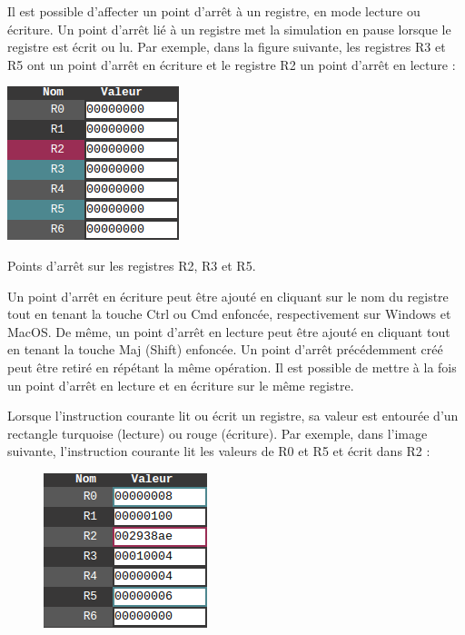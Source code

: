 \documentclass{tufte-handout}
\begin{document}
Il est possible d'affecter un point d'arrêt à un registre, en mode lecture ou écriture. Un point d'arrêt lié à un registre met la simulation en pause lorsque le registre est écrit ou lu. Par exemple, dans la figure suivante, les registres R3 et R5 ont un point d'arrêt en écriture et le registre R2 un point d'arrêt en lecture :
\begin{marginfigure}
\includegraphics[width=0.8\linewidth]{pics/registres_bkpt.png}
\label{f:regbkpt}
\caption{Points d'arrêt sur les registres R2, R3 et R5.}
\end{marginfigure}

Un point d'arrêt en écriture peut être ajouté en cliquant sur le nom du registre tout en tenant la touche Ctrl ou Cmd enfoncée, respectivement sur Windows et MacOS. De même, un point d'arrêt en lecture peut être ajouté en cliquant tout en tenant la touche Maj (Shift) enfoncée. Un point d'arrêt précédemment créé peut être retiré en répétant la même opération. Il est possible de mettre à la fois un point d'arrêt en lecture et en écriture sur le même registre.

Lorsque l'instruction courante lit ou écrit un registre, sa valeur est entourée d'un rectangle turquoise (lecture) ou rouge (écriture). Par exemple, dans l'image suivante, l'instruction courante lit les valeurs de R0 et R5 et écrit dans R2 :
\begin{figure}[h!]
\raggedright
\includegraphics[width=0.38\linewidth]{pics/registres_statuts.png}
\label{f:regstatut}
\end{figure}
\end{document}
